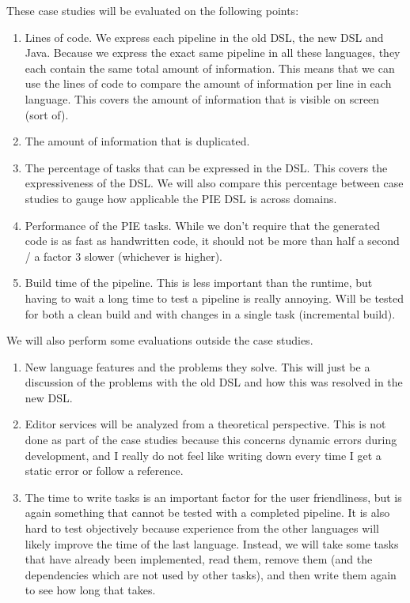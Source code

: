 These case studies will be evaluated on the following points:
\begin{enumerate}
  \item Lines of code.
  We express each pipeline in the old DSL, the new DSL and Java.
  Because we express the exact same pipeline in all these languages, they each contain the same total amount of information.
  This means that we can use the lines of code to compare the amount of information per line in each language.
  This covers the amount of information that is visible on screen (sort of).
  \item The amount of information that is duplicated. 
  \item The percentage of tasks that can be expressed in the DSL.
  This covers the expressiveness of the DSL.
  We will also compare this percentage between case studies to gauge how applicable the PIE DSL is across domains.
  \item Performance of the PIE tasks.
  While we don't require that the generated code is as fast as handwritten code, it should not be more than half a second / a factor 3 slower (whichever is higher).
  \item Build time of the pipeline.
  This is less important than the runtime, but having to wait a long time to test a pipeline is really annoying.
  Will be tested for both a clean build and with changes in a single task (incremental build).
\end{enumerate}

We will also perform some evaluations outside the case studies.
\begin{enumerate}
  \item New language features and the problems they solve.
  This will just be a discussion of the problems with the old DSL and how this was resolved in the new DSL.
  \item Editor services will be analyzed from a theoretical perspective.
  This is not done as part of the case studies because this concerns dynamic errors during development, and I really do not feel like writing down every time I get a static error or follow a reference.
  \item The time to write tasks is an important factor for the user friendliness, but is again something that cannot be tested with a completed pipeline.
  It is also hard to test objectively because experience from the other languages will likely improve the time of the last language.
  Instead, we will take some tasks that have already been implemented, read them, remove them (and the dependencies which are not used by other tasks), and then write them again to see how long that takes.
\end{enumerate}


